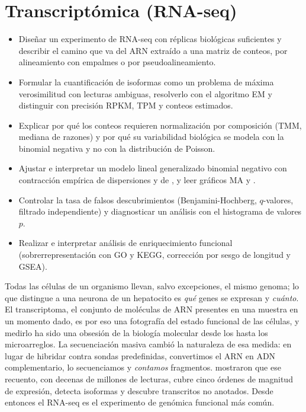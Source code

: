 \chapter{Transcriptómica (RNA-seq)}\label{cap:11}


\begin{objetivos}
\begin{itemize}
  \item Diseñar un experimento de RNA-seq con réplicas biológicas suficientes y describir el camino que va del ARN extraído a una matriz de conteos, por alineamiento con empalmes o por pseudoalineamiento.
  \item Formular la cuantificación de isoformas como un problema de máxima verosimilitud con lecturas ambiguas, resolverlo con el algoritmo EM y distinguir con precisión RPKM, TPM y conteos estimados.
  \item Explicar por qué los conteos requieren normalización por composición (TMM, mediana de razones) y por qué su variabilidad biológica se modela con la binomial negativa y no con la distribución de Poisson.
  \item Ajustar e interpretar un modelo lineal generalizado binomial negativo con contracción empírica de dispersiones y de , y leer gráficos MA y .
  \item Controlar la tasa de falsos descubrimientos (Benjamini-Hochberg, $q$-valores, filtrado independiente) y diagnosticar un análisis con el histograma de valores $p$.
  \item Realizar e interpretar análisis de enriquecimiento funcional (sobrerrepresentación con GO y KEGG, corrección por sesgo de longitud y GSEA).
\end{itemize}
\end{objetivos}

Todas las células de un organismo llevan, salvo excepciones, el mismo genoma; lo que distingue a una neurona de un hepatocito es \emph{qué} genes se expresan y \emph{cuánto}. El transcriptoma, el conjunto de moléculas de ARN presentes en una muestra en un momento dado, es por eso una fotografía del estado funcional de las células, y medirlo ha sido una obsesión de la biología molecular desde los  hasta los microarreglos. La secuenciación masiva cambió la naturaleza de esa medida: en lugar de hibridar contra sondas predefinidas, convertimos el ARN en ADN complementario, lo secuenciamos y \emph{contamos} fragmentos. \textcite{c11-mortazavi2008} mostraron que ese recuento, con decenas de millones de lecturas, cubre cinco órdenes de magnitud de expresión, detecta isoformas y descubre transcritos no anotados. Desde entonces el RNA-seq es el experimento de genómica funcional más común.

